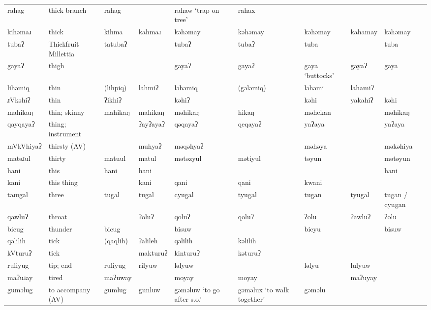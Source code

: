 \begin{landscape}
\begin{longtable}{*{9}{>{\raggedright\arraybackslash}p{}}}
\text{*}rahag        & thick branch & rahag &  & rahaw \newline `trap on tree' & rahax &  &  & \\
\text{*}kihəmaɹ      & thick & kihma & kahmaɹ & kəhəmay & kəhəmay & kəhəmay & kahamay & kəhəmay\\
\text{*}tubaʔ        & Thickfruit Millettia & tatubaʔ &  & tubaʔ & tubaʔ & tuba &  & tuba\\
\text{*}gayaʔ        & thigh &  &  & gayaʔ & gayaʔ & gaya \newline `buttocks' & gayaʔ & gaya\\
\text{*}lihəmiq      & thin & (lihpiq) & lahmiʔ & ləhəmiq & (gələmiq) & ləhəmi & lahamiʔ & \\
\text{*}ɹVkəhiʔ      & thin & ʔikhiʔ &  & kəhiʔ &  & kəhi & yakahiʔ & kəhi\\
\text{*}mahikaŋ      & thin; skinny & mahikaŋ & mahikaŋ & məhikaŋ & hikaŋ & məhekan &  & məhikaŋ\\
\text{*}qayqayaʔ     & thing; instrument &  & ʔayʔayaʔ & qəqayaʔ & qeqayaʔ & yaʔaya &  & yaʔaya\\
\text{*}mVkVhiyaʔ    & thirsty (AV) &  & muhyaʔ & məqəhyaʔ &  & məhəya &  & məkəhiya\\
\text{*}matəɹul      & thirty & matuul & matul & mətəzyul & mətiyul & təyun &  & mətəyun\\
\text{*}hani         & this & hani & hani &  &  &  &  & hani\\
\text{*}kani         & this thing &  & kani & qani & qani & kwani &  & \\
\text{*}təɹugal      & three & tugal & tugal & cyugal & tyugal & tugan & tyugal & tugan / cyugan\\
\text{*}qawluʔ       & throat &  & ʔoluʔ & qoluʔ & qoluʔ & ʔolu & ʔawluʔ & ʔolu\\
\text{*}bicug        & thunder & bicug &  & bisuw &  & bicyu &  & bisuw\\
\text{*}qəlilih      & tick & (qaqlih) & ʔalileh & qəlilih & kəlilih &  &  & \\
\text{*}kVturuʔ      & tick &  & makturuʔ & kinturuʔ & kəturuʔ &  &  & \\
\text{*}ruliyug      & tip; end & ruliyug & rilyuw & ləlyuw &  & ləlyu & lulyuw & \\
\text{*}maʔuɹay      & tired & maʔuway &  & moyay & moyay &  & maʔuyay & \\
\text{*}guməlug      & to accompany (AV) & gumlug & gunluw & gəməluw `to go after s.o.' & gəməlux `to walk together' & gəməlu &  & \\

\end{longtable}
\end{landscape}

